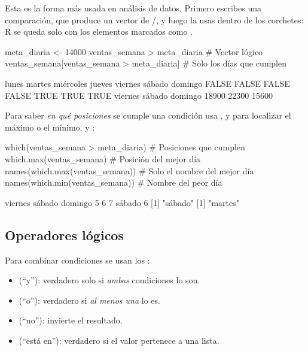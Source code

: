 Esta es la forma más usada en análisis de datos. Primero escribes una
comparación, que produce un vector de /, y
luego la usas dentro de los corchetes: R se queda solo con los elementos
marcados como .

\begin{rcode}
meta_diaria <- 14000
ventas_semana > meta_diaria                  # Vector lógico
ventas_semana[ventas_semana > meta_diaria]   # Solo los días que cumplen
\end{rcode}
\begin{rsalida}
    lunes    martes miércoles    jueves   viernes    sábado   domingo 
    FALSE     FALSE     FALSE     FALSE      TRUE      TRUE      TRUE 
viernes  sábado domingo 
  18900   22300   15600 
\end{rsalida}

Para saber \emph{en qué posiciones} se cumple una condición usa
, y para localizar el máximo o el mínimo,
 y :

\begin{rcode}
which(ventas_semana > meta_diaria)   # Posiciones que cumplen
which.max(ventas_semana)             # Posición del mejor día
names(which.max(ventas_semana))      # Solo el nombre del mejor día
names(which.min(ventas_semana))      # Nombre del peor día
\end{rcode}
\begin{rsalida}
viernes  sábado domingo 
      5       6       7 
sábado 
     6 
[1] "sábado"
[1] "martes"
\end{rsalida}

\subsection{Operadores lógicos}

Para combinar condiciones se usan los :

\begin{itemize}
  \item \codigo{\&} (``y''): verdadero solo si \emph{ambas} condiciones lo
        son.
  \item \codigo{|} (``o''): verdadero si \emph{al menos una} lo es.
  \item \codigo{!} (``no''): invierte el resultado.
  \item {} (``está en''): verdadero si el valor pertenece a
        una lista.
\end{itemize}

